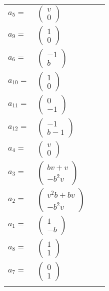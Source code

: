 \documentclass[1p]{elsarticle_modified}
\theoremstyle{definition}
\begin{document}
\begin{tabular}{m{7pt} m{180pt} m{7pt} m{180pt} }
\flushright $a_{5}=$&$\begin{pmatrix}v\\0\end{pmatrix}$ \\
\flushright $a_{9}=$&$\begin{pmatrix}1\\0\end{pmatrix}$ \\
\flushright $a_{6}=$&$\begin{pmatrix}-1\\b\end{pmatrix}$ \\
\flushright $a_{10}=$&$\begin{pmatrix}1\\0\end{pmatrix}$ \\
\flushright $a_{11}=$&$\begin{pmatrix}0\\-1\end{pmatrix}$ \\
\flushright $a_{12}=$&$\begin{pmatrix}-1\\b-1\end{pmatrix}$ \\
\flushright $a_{4}=$&$\begin{pmatrix}v\\0\end{pmatrix}$ \\
\flushright $a_{3}=$&$\begin{pmatrix}b v+v\\- b^2 v\end{pmatrix}$ \\
\flushright $a_{2}=$&$\begin{pmatrix}v^2 b+b v\\- b^2 v\end{pmatrix}$ \\
\flushright $a_{1}=$&$\begin{pmatrix}1\\- b\end{pmatrix}$ \\
\flushright $a_{8}=$&$\begin{pmatrix}1\\1\end{pmatrix}$ \\
\flushright $a_{7}=$&$\begin{pmatrix}0\\1\end{pmatrix}$\\&\end{tabular}
\end{document}
